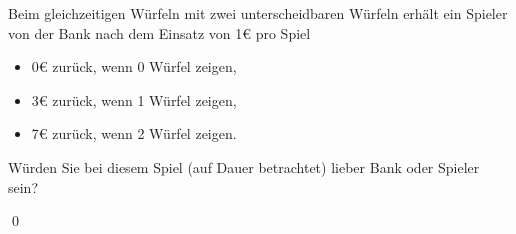 \documentclass{abgabe}
\begin{document}
\begin{questions}
    \question
    Beim gleichzeitigen Würfeln mit zwei unterscheidbaren Würfeln erhält ein Spieler von der Bank nach dem Einsatz von 1€ pro Spiel
    \begin{itemize}
        \item 0€ zurück, wenn 0 Würfel  zeigen,
        \item 3€ zurück, wenn 1 Würfel  zeigen,
        \item 7€ zurück, wenn 2 Würfel  zeigen.
    \end{itemize}
    Würden Sie bei diesem Spiel (auf Dauer betrachtet) lieber Bank oder Spieler sein?
    \begin{solution}

        \qed
    \end{solution}
\end{questions}
\end{document}
